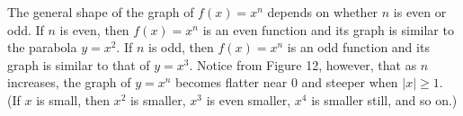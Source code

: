 \documentclass{sebase}
\begin{document}
The general shape of the graph of $f(x)=x^{n}$ depends on whether $n$ is
even or odd. If $n$ is even, then $f(x)=x^{n}$ is an even function and its
graph is similar to the parabola $y=x^{2}$. If $n$ is odd, then $f(x)=x^{n}$
is an odd function and its graph is similar to that of $y=x^{3}$. Notice
from Figure 12, however, that as $n$ increases, the graph of $y=x^{n}$
becomes flatter near 0 and steeper when $\left\vert x\right\vert \geq 1$.
(If $x$ is small, then $x^{2}$ is smaller, $x^{3}$ is even smaller, $x^{4}$
is smaller still, and so on.)\\[4pt]
\hspace*{\fill}\hspace*{\fill}%
\vspace{8pt}
\end{document}
